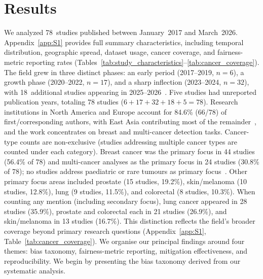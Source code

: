 
\section{Results}
\label{sec:results}

We analyzed 78~studies published between January~2017 and March~2026.
\label{sec:results:temporal}
\label{sec:results:characteristics}
\label{sec:results:cancer}
Appendix~\ref{app:S1} provides full summary characteristics,
including temporal distribution, geographic spread, dataset usage,
cancer coverage, and fairness-metric reporting rates
(Tables~\ref{tab:study_characteristics}--\ref{tab:cancer_coverage}).
The field grew in three distinct phases: an early period (2017--2019,
$n=6$), a growth phase (2020--2022, $n=17$), and a sharp inflection
(2023--2024, $n=32$), with 18~additional studies appearing in
2025--2026~\citep{howard2021site, vaidya2024demographic,
komen2024batch}. Five studies had unreported publication years, totaling 78 studies ($6+17+32+18+5=78$). Research institutions in North America and Europe account for 84.6\% (66/78) of first/corresponding authors, with East Asia contributing most of the remainder~\citep{celi2022sources, musa2026cross},
and the work concentrates on breast and multi-cancer detection tasks.
Cancer-type counts are non-exclusive (studies addressing multiple cancer types are counted under each category). Breast cancer was the primary focus in 44 studies (56.4\% of 78) and multi-cancer analyses as the primary focus in 24 studies (30.8\% of 78); no studies address paediatric or rare tumours as primary focus~\citep{tasci2022bias}. Other primary focus areas included prostate (15 studies, 19.2\%), skin/melanoma (10 studies, 12.8\%), lung (9 studies, 11.5\%), and colorectal (8 studies, 10.3\%). When counting any mention (including secondary focus), lung cancer appeared in 28 studies (35.9\%), prostate and colorectal each in 21 studies (26.9\%), and skin/melanoma in 13 studies (16.7\%). This distinction reflects the field's broader coverage beyond primary research questions (Appendix~\ref{app:S1}, Table~\ref{tab:cancer_coverage}).
We organise our principal findings around four themes: bias taxonomy,
fairness-metric reporting, mitigation effectiveness, and
reproducibility. We begin by presenting the bias taxonomy derived from our systematic analysis.

